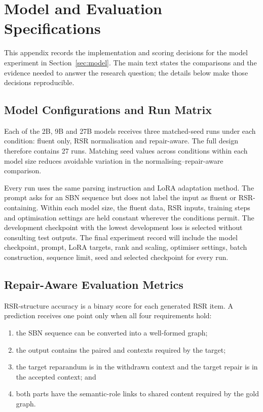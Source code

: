 \documentclass{article}
\begin{document}
\section{Model and Evaluation Specifications}
\label{app:model-evaluation}

This appendix records the implementation and scoring decisions for the model
experiment in Section~\ref{sec:model}. The main text states the
comparisons and the evidence needed to answer the research question; the
details below make those decisions reproducible.

\subsection{Model Configurations and Run Matrix}
\label{app:model-config}

Each of the 2B, 9B and 27B models receives three matched-seed runs under each
condition: fluent only, RSR normalisation and repair-aware. The full design
therefore contains 27 runs. Matching seed values across conditions within each
model size reduces avoidable variation in the normalising--repair-aware
comparison.

Every run uses the same parsing instruction and LoRA adaptation method. The
prompt asks for an SBN sequence but does not label the input as fluent or
RSR-containing. Within each model size, the fluent data, RSR inputs, training steps
and optimisation settings are held constant wherever the conditions permit.
The development checkpoint with the lowest development loss is selected
without consulting test outputs. The final experiment record will include the
model checkpoint, prompt, LoRA targets, rank and scaling, optimiser settings,
batch construction, sequence limit, seed and selected checkpoint for every
run.

\subsection{Repair-Aware Evaluation Metrics}
\label{app:model-metrics}

RSR-structure accuracy is a binary score for each generated RSR item. A
prediction receives one point only when all four requirements hold:

\begin{enumerate}[nosep]
  \item the SBN sequence can be converted into a well-formed graph;
  \item the output contains the paired  and
         contexts required by the target;
  \item the target reparandum is in the withdrawn context and the target repair
        is in the accepted context; and
  \item both parts have the semantic-role links to shared content required by
        the gold graph.
\end{enumerate}
\end{document}
